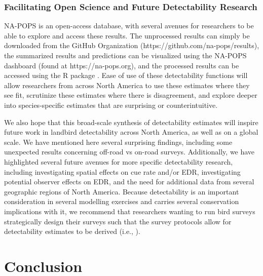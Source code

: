 \subsubsection{Facilitating Open Science and Future Detectability Research}

\par NA-POPS is an open-access database, with several avenues for researchers to be able to explore and access these results. The unprocessed results can simply be downloaded from the GitHub Organization (https://github.com/na-pops/results), the summarized results and predictions can be visualized using the NA-POPS dashboard (found at https://na-pops.org), and the processed results can be accessed using the R package  \citep{edwards_napops_2022}. Ease of use of these detectability functions will allow researchers from across North America to use these estimates where they see fit, scrutinize these estimates where there is disagreement, and explore deeper into species-specific estimates that are surprising or counterintuitive.

\par We also hope that this broad-scale synthesis of detectability estimates will inspire future work in landbird detectability across North America, as well as on a global scale. We have mentioned here several surprising findings, including some unexpected results concerning off-road vs on-road surveys. Additionally, we have highlighted several future avenues for more specific detectability research, including investigating spatial effects on cue rate and/or EDR, investigating potential observer effects on EDR, and the need for additional data from several geographic regions of North America. Because detectability is an important consideration in several modelling exercises and carries several conservation implications with it, we recommend that researchers wanting to run bird surveys strategically design their surveys such that the survey protocols allow for detectability estimates to be derived (i.e., \citet{matsuoka_reviving_2014}). 

\section{Conclusion}


